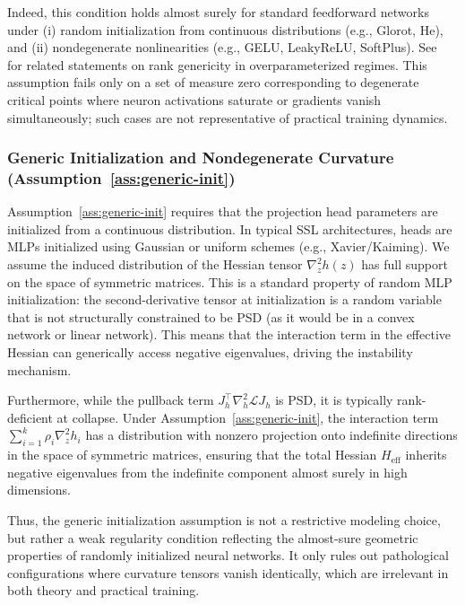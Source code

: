 \documentclass{article}
\theoremstyle{plain}
\theoremstyle{definition}
\theoremstyle{remark}
\begin{document}
Indeed, this condition holds almost surely for standard feedforward networks under (i) random initialization from continuous distributions (e.g., Glorot, He), and (ii) nondegenerate nonlinearities (e.g., GELU, LeakyReLU, SoftPlus). See~\citet{sagun2018empirical, arora2019finegrained} for related statements on rank genericity in overparameterized regimes. This assumption fails only on a set of measure zero corresponding to degenerate critical points where neuron activations saturate or gradients vanish simultaneously; such cases are not representative of practical training dynamics.

\subsubsection{Generic Initialization and Nondegenerate Curvature (Assumption~\ref{ass:generic-init})}

Assumption~\ref{ass:generic-init} requires that the projection head parameters are initialized from a continuous distribution. In typical SSL architectures, heads are MLPs initialized using Gaussian or uniform schemes (e.g., Xavier/Kaiming). We assume the induced distribution of the Hessian tensor $\nabla^2_z h(z)$ has full support on the space of symmetric matrices. This is a standard property of random MLP initialization: the second-derivative tensor at initialization is a random variable that is not structurally constrained to be PSD (as it would be in a convex network or linear network). This means that the interaction term in the effective Hessian can generically access negative eigenvalues, driving the instability mechanism.

Furthermore, while the pullback term $J_h^\top \nabla^2_h \mathcal{L} J_h$ is PSD, it is typically rank-deficient at collapse. Under Assumption~\ref{ass:generic-init}, the interaction term $\sum_{i=1}^k \rho_i \nabla^2_z h_i$ has a distribution with nonzero projection onto indefinite directions in the space of symmetric matrices, ensuring that the total Hessian $H_{\text{eff}}$ inherits negative eigenvalues from the indefinite component almost surely in high dimensions.

Thus, the generic initialization assumption is not a restrictive modeling choice, but rather a weak regularity condition reflecting the almost-sure geometric properties of randomly initialized neural networks. It only rules out pathological configurations where curvature tensors vanish identically, which are irrelevant in both theory and practical training.
\end{document}
